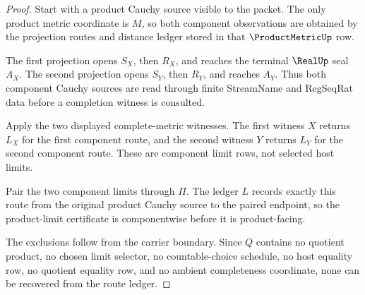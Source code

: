 \begin{proof}
Start with a product Cauchy source visible to the packet. The only product
metric coordinate is $M$, so both component observations are obtained by the
projection routes and distance ledger stored in that $\ProductMetricUp$ row.

The first projection opens $S_X$, then $R_X$, and reaches the terminal
$\RealUp$ seal $A_X$. The second projection opens $S_Y$, then $R_Y$, and
reaches $A_Y$. Thus both component Cauchy sources are read through finite
StreamName and RegSeqRat data before a completion witness is consulted.

Apply the two displayed complete-metric witnesses. The first witness $X$
returns $L_X$ for the first component route, and the second witness $Y$
returns $L_Y$ for the second component route. These are component limit rows,
not selected host limits.

Pair the two component limits through $\Pi$. The ledger $L$ records exactly
this route from the original product Cauchy source to the paired endpoint, so
the product-limit certificate is componentwise before it is product-facing.

The exclusions follow from the carrier boundary. Since $Q$ contains no
quotient product, no chosen limit selector, no countable-choice schedule, no
host equality row, no quotient equality row, and no ambient completeness
coordinate, none can be recovered from the route ledger.
\end{proof}


\begin{closurestatus}{\CompleteMetricProductUp}
  \theoryclosure{\seedClosure}
  \formalstatus{\unformalizedV}
\end{closurestatus}
